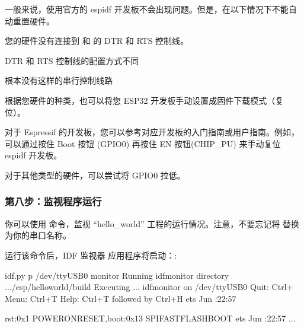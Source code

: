 \documentclass[a4paper,12pt,english]{sphinxmanual}
\begin{document}
\sphinxAtStartPar
一般来说，使用官方的 esp\sphinxhyphen{}idf 开发板不会出现问题。但是，在以下情况下不能自动重置硬件。

\sphinxAtStartPar
您的硬件没有连接到 和  的 DTR 和 RTS 控制线。

\sphinxAtStartPar
DTR 和 RTS 控制线的配置方式不同

\sphinxAtStartPar
根本没有这样的串行控制线路

\sphinxAtStartPar
根据您硬件的种类，也可以将您 ESP32 开发板手动设置成固件下载模式（复位）。

\sphinxAtStartPar
对于 Espressif 的开发板，您可以参考对应开发板的入门指南或用户指南。例如，可以通过按住 Boot 按钮 (GPIO0) 再按住 EN 按钮(CHIP\_PU) 来手动复位 esp\sphinxhyphen{}idf 开发板。

\sphinxAtStartPar
对于其他类型的硬件，可以尝试将 GPIO0 拉低。


\subsubsection{第八步：监视程序运行}
\label{\detokenize{exp-esp32/ide/esp-idf-cli:id12}}
\sphinxAtStartPar
你可以使用  命令，监视 “hello\_world” 工程的运行情况。注意，不要忘记将  替换为你的串口名称。

\sphinxAtStartPar
运行该命令后，IDF 监视器 应用程序将启动：:

\begin{sphinxVerbatim}[commandchars=\\\{\}]
\PYGZdl{} idf.py \PYGZhy{}p /dev/ttyUSB0 monitor
Running idf\PYGZus{}monitor  directory \PYG{o}{[}...\PYG{o}{]}/esp/hello\PYGZus{}world/build
Executing ...
\PYGZhy{}\PYGZhy{}\PYGZhy{} idf\PYGZus{}monitor on /dev/ttyUSB0  \PYGZhy{}\PYGZhy{}\PYGZhy{}
\PYGZhy{}\PYGZhy{}\PYGZhy{} Quit: Ctrl+\PYG{o}{]}  Menu: Ctrl+T  Help: Ctrl+T followed by Ctrl+H \PYGZhy{}\PYGZhy{}\PYGZhy{}
ets Jun    :22:57

rst:0x1 POWERON\PYGZus{}RESET,boot:0x13 SPI\PYGZus{}FAST\PYGZus{}FLASH\PYGZus{}BOOT
ets Jun    :22:57
...
\end{sphinxVerbatim}
\end{document}
